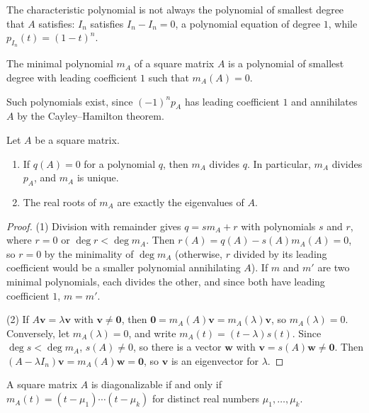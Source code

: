 The characteristic polynomial is not always the polynomial of smallest degree that $A$ satisfies: $I_n$ satisfies $I_n - I_n = 0$, a polynomial equation of degree $1$, while $p_{I_n}(t) = (1 - t)^n$.

\begin{definition}
    The minimal polynomial $m_A$ of a square matrix $A$ is a polynomial of smallest degree with leading coefficient $1$ such that $m_A(A) = 0$.
\end{definition}

Such polynomials exist, since $(-1)^np_A$ has leading coefficient $1$ and annihilates $A$ by the Cayley--Hamilton theorem.

\begin{proposition}\label{L1-prop:minimal-polynomial}
    Let $A$ be a square matrix.
    \begin{enumerate}
        \item If $q(A) = 0$ for a polynomial $q$, then $m_A$ divides $q$. In particular, $m_A$ divides $p_A$, and $m_A$ is unique.
        \item The real roots of $m_A$ are exactly the eigenvalues of $A$.
    \end{enumerate}
\end{proposition}

\begin{proof}
    (1) Division with remainder gives $q = sm_A + r$ with polynomials $s$ and $r$, where $r = 0$ or $\deg r < \deg m_A$. Then $r(A) = q(A) - s(A)m_A(A) = 0$, so $r = 0$ by the minimality of $\deg m_A$ (otherwise, $r$ divided by its leading coefficient would be a smaller polynomial annihilating $A$). If $m$ and $m'$ are two minimal polynomials, each divides the other, and since both have leading coefficient $1$, $m = m'$.

    (2) If $A\mathbf{v} = \lambda\mathbf{v}$ with $\mathbf{v} \neq \mathbf{0}$, then $\mathbf{0} = m_A(A)\mathbf{v} = m_A(\lambda)\mathbf{v}$, so $m_A(\lambda) = 0$. Conversely, let $m_A(\lambda) = 0$, and write $m_A(t) = (t - \lambda)s(t)$. Since $\deg s < \deg m_A$, $s(A) \neq 0$, so there is a vector $\mathbf{w}$ with $\mathbf{v} = s(A)\mathbf{w} \neq \mathbf{0}$. Then $(A - \lambda I_n)\mathbf{v} = m_A(A)\mathbf{w} = \mathbf{0}$, so $\mathbf{v}$ is an eigenvector for $\lambda$.
\end{proof}

\begin{theorem}\label{L1-thm:minimal-diagonalizable}
    A square matrix $A$ is diagonalizable if and only if $m_A(t) = (t - \mu_1) \cdots (t - \mu_k)$ for distinct real numbers $\mu_1, \ldots, \mu_k$.
\end{theorem}


